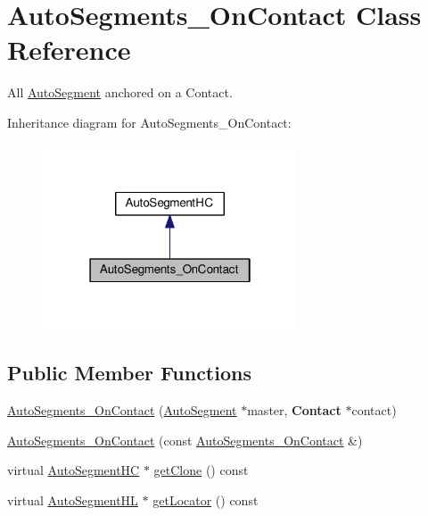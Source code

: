 \hypertarget{classKatabatic_1_1AutoSegments__OnContact}{}\section{Auto\+Segments\+\_\+\+On\+Contact Class Reference}
\label{classKatabatic_1_1AutoSegments__OnContact}


All \mbox{\hyperlink{classKatabatic_1_1AutoSegment}{Auto\+Segment}} anchored on a Contact.  




Inheritance diagram for Auto\+Segments\+\_\+\+On\+Contact\+:\nopagebreak
\begin{figure}[H]
\begin{center}
\leavevmode
\includegraphics[width=214pt]{classKatabatic_1_1AutoSegments__OnContact__inherit__graph}
\end{center}
\end{figure}
\subsection*{Public Member Functions}
\begin{DoxyCompactItemize}
\item 
\mbox{\hyperlink{classKatabatic_1_1AutoSegments__OnContact_af3f727d0c0fe394da508f52a6c9e4b90}{Auto\+Segments\+\_\+\+On\+Contact}} (\mbox{\hyperlink{classKatabatic_1_1AutoSegment}{Auto\+Segment}} $\ast$master, \textbf{ Contact} $\ast$contact)
\item 
\mbox{\hyperlink{classKatabatic_1_1AutoSegments__OnContact_ab6ff1773c5335fe496f61f2703a5ac99}{Auto\+Segments\+\_\+\+On\+Contact}} (const \mbox{\hyperlink{classKatabatic_1_1AutoSegments__OnContact}{Auto\+Segments\+\_\+\+On\+Contact}} \&)
\item 
virtual \mbox{\hyperlink{namespaceKatabatic_acb3628dc7705fefe38a665cfe43efa6e}{Auto\+Segment\+HC}} $\ast$ \mbox{\hyperlink{classKatabatic_1_1AutoSegments__OnContact_a5b26b0698bdcb40cbf51b250dfb21858}{get\+Clone}} () const
\item 
virtual \mbox{\hyperlink{namespaceKatabatic_a40ef13471fd0e797b75d3c436813fe65}{Auto\+Segment\+HL}} $\ast$ \mbox{\hyperlink{classKatabatic_1_1AutoSegments__OnContact_a07665c070fcc269aec02ce842f384483}{get\+Locator}} () const
\end{DoxyCompactItemize}



